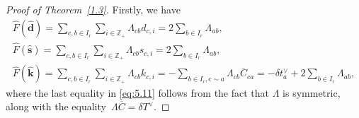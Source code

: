 \documentclass[10pt,a4paper]{amsart}
\numberwithin{equation}{section}
\begin{document}
\begin{proof}[Proof of Theorem~\ref{1.3}]
Firstly, we have
\begin{gather}%
\widehat{F}(\widehat{\mathbf{d}})
=\sum_{c,b\in I_r}\sum_{i\in\mathbb{Z}_+}\Lambda_{cb}d_{c,i}
=2\sum_{b\in I_r}\Lambda_{ab},\label{eq:5.9}\\
\widehat{F}(\widehat{\mathbf{s}})
=\sum_{c,b\in I_r}\sum_{i\in\mathbb{Z}_+}\Lambda_{cb}s_{c,i}
=2\sum_{b\in I_r}\Lambda_{ab},\\
\widehat{F}(\widehat{\mathbf{k}})
=\sum_{c,b\in I_r}\sum_{i\in\mathbb{Z}_+}\Lambda_{cb}k_{c,i}
=-\sum_{b\in I_r,c\sim a}\Lambda_{cb}\overline{C}_{ca}
=-\delta t_a^{\vee}+2\sum_{b\in I_r}\Lambda_{ab},\label{eq:5.11}
\end{gather}
where the last equality in \eqref{eq:5.11} follows from the fact that $\Lambda$ is symmetric, along with the equality~${\Lambda\overline{C}=\delta T^{\vee}}$.


\end{proof}
\end{document}
